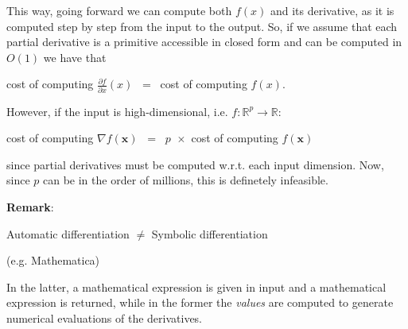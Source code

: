 This way, going forward we can compute both $f(x)$ and its derivative, as it is computed step by step from the input to the output.
So, if we assume that each partial derivative is a primitive accessible in closed form and can be computed in $O(1)$ we have that
\begin{center}
cost of computing $\frac{\partial f}{\partial x}(x)$ {\Large~=~} cost of computing $f(x)$.
\end{center}

However, if the input is high-dimensional, i.e. $f:\mathbb{R}^p\to\mathbb{R}$:
\begin{center}
cost of computing $\nabla  f(\mathbf{x})$ {\Large~=~} $p\,~ \times$ cost of computing $f(\mathbf{x})$
\end{center}
since partial derivatives must be computed w.r.t. each input dimension. Now, since $p$ can be in the order of millions, this is definetely infeasible.

\textbf{Remark}:
\begin{center}
{Automatic differentiation} $\neq$ {Symbolic differentiation}

\hspace{0.6cm}{(e.g. autograd)} \quad\hspace{0.8cm} {(e.g. Mathematica)}
\end{center}

In the latter, a mathematical expression is given in input and a mathematical expression is returned, while in the former the \emph{values} are computed to generate numerical evaluations of the derivatives.